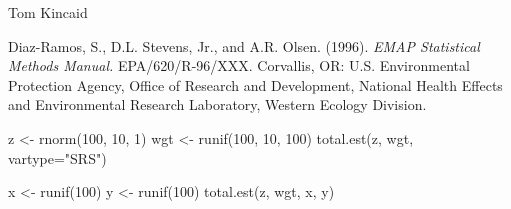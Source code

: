 \begin{Author}\relax
Tom Kincaid 
\end{Author}
\begin{References}\relax
Diaz-Ramos, S., D.L. Stevens, Jr., and A.R. Olsen. (1996).  \emph{EMAP
Statistical Methods Manual.} EPA/620/R-96/XXX.  Corvallis, OR: U.S.
Environmental Protection Agency, Office of Research and Development, National
Health Effects and Environmental Research Laboratory, Western Ecology
Division.
\end{References}
\begin{Examples}
\begin{ExampleCode}
z <- rnorm(100, 10, 1)
wgt <- runif(100, 10, 100)
total.est(z, wgt, vartype="SRS")

x <- runif(100)
y <- runif(100)
total.est(z, wgt, x, y)
\end{ExampleCode}
\end{Examples}

